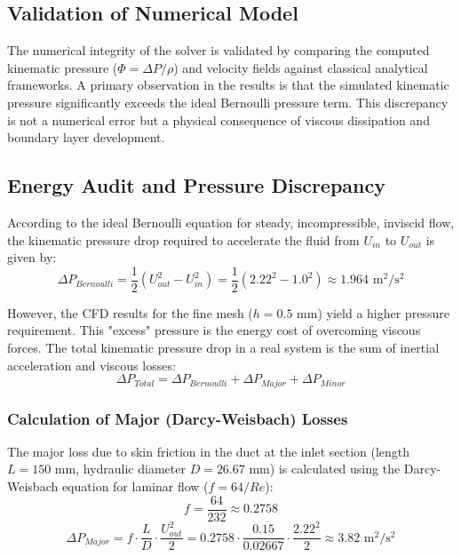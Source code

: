 \documentclass[12pt, a4paper]{article}
\begin{document}
\subsection{Validation of Numerical Model}

The numerical integrity of the solver is validated by comparing the computed kinematic pressure ($\Phi = \Delta P/\rho$) and velocity fields against classical analytical frameworks. A primary observation in the results is that the simulated kinematic pressure significantly exceeds the ideal Bernoulli pressure term. This discrepancy is not a numerical error but a physical consequence of viscous dissipation and boundary layer development.

\subsection{Energy Audit and Pressure Discrepancy}

According to the ideal Bernoulli equation for steady, incompressible, inviscid flow, the kinematic pressure drop required to accelerate the fluid from $U_{in}$ to $U_{out}$ is given by:
\begin{equation}
	\Delta P_{Bernoulli} = \frac{1}{2} (U_{out}^2 - U_{in}^2) = \frac{1}{2} (2.22^2 - 1.0^2) \approx 1.964 \text{ m}^2/\text{s}^2
\end{equation}

However, the CFD results for the fine mesh ($h=0.5$ mm) yield a higher pressure requirement. This "excess" pressure is the energy cost of overcoming viscous forces. The total kinematic pressure drop in a real system is the sum of inertial acceleration and viscous losses:
\begin{equation}
	\Delta P_{Total} = \Delta P_{Bernoulli} + \Delta P_{Major} + \Delta P_{Minor}
\end{equation}

\subsubsection{Calculation of Major (Darcy-Weisbach) Losses}
The major loss due to skin friction in the duct at the inlet section (length $L = 150$ mm, hydraulic diameter $D = 26.67$ mm) is calculated using the Darcy-Weisbach equation for laminar flow ($f = 64/Re$):
\begin{equation}
	f = \frac{64}{232} \approx 0.2758
\end{equation}
\begin{equation}
	\Delta P_{Major} = f \cdot \frac{L}{D} \cdot \frac{U_{out}^2}{2} = 0.2758 \cdot \frac{0.15}{0.02667} \cdot \frac{2.22^2}{2} \approx 3.82 \text{ m}^2/\text{s}^2
\end{equation}
\end{document}
